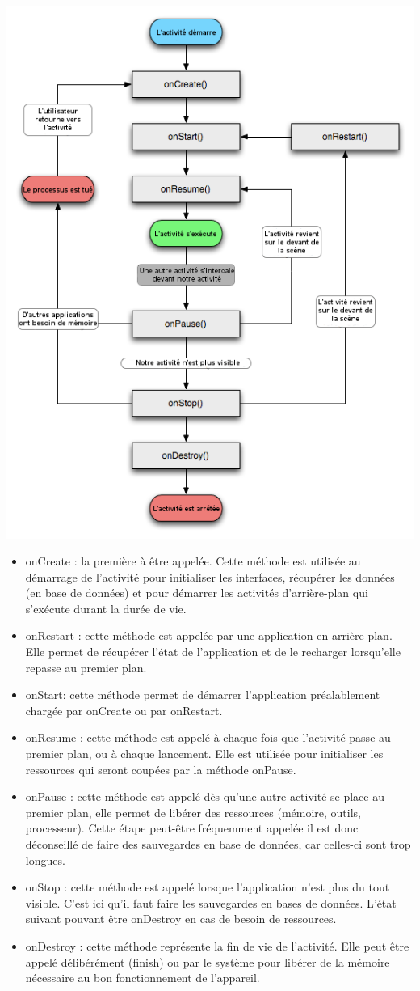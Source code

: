 \documentclass[francais,12pt]{article}
\begin{document}
		\begin{center}
			\includegraphics[width=0.6\linewidth]{images/cycleVie}
		\end{center}
	\newpage
		
		\begin{itemize}
			\item onCreate : la première à être appelée. Cette méthode est utilisée au démarrage de l'activité pour initialiser les interfaces, récupérer les données (en base de données) et pour démarrer les activités d'arrière-plan qui s'exécute durant la durée de vie.
			\item onRestart : cette méthode est appelée par une application en arrière plan. Elle permet de récupérer l'état de l'application et de le recharger lorsqu'elle repasse au premier plan.
			\item onStart: cette méthode permet de démarrer l'application préalablement chargée par onCreate ou par onRestart.
			\item onResume : cette méthode est appelé à chaque fois que l'activité passe au premier plan, ou à chaque lancement. Elle est utilisée pour initialiser les ressources qui seront coupées par la méthode onPause. 
			\item onPause : cette méthode est appelé dès qu'une autre activité se place au premier plan, elle permet de libérer des ressources (mémoire, outils, processeur). Cette étape peut-être fréquemment appelée il est donc déconseillé de faire des sauvegardes en base de données, car celles-ci sont trop longues.
			\item onStop : cette méthode est appelé lorsque l'application n'est plus du tout visible. C'est ici qu'il faut faire les sauvegardes en bases de données. L'état suivant pouvant être onDestroy en cas de besoin de ressources. 
			\item onDestroy : cette méthode représente la fin de vie de l'activité. Elle peut être appelé délibérément (finish) ou par le système pour libérer de la mémoire nécessaire au bon fonctionnement de l'appareil.		
		\end{itemize}
		
\end{document}
